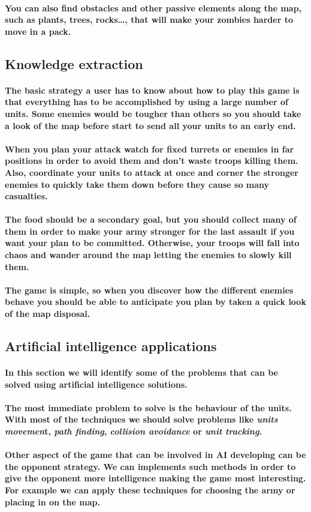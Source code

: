 \documentclass[a4paper,10pt]{article}
\newcommand{\p}[1]{\paragraph{\indent\textnormal{#1}}}
\begin{document}
  \p{You can also find obstacles and other passive elements along the map, such as plants, trees, rocks\dots, that will make your zombies harder to move in a pack.}

\newpage
  \subsection{Knowledge extraction}

    \p{The basic strategy a user has to know about how to play this game is that everything has to be accomplished by using a large number of units. Some enemies would be tougher than others so you should take a look of the map before start to send all your units to an early end.}

    \p{When you plan your attack watch for fixed turrets or enemies in far positions in order to avoid them and don't waste troops killing them. Also, coordinate your units to attack at once and corner the stronger enemies to quickly take them down before they cause so many casualties.}

    \p{The food should be a secondary goal, but you should collect many of them in order to make your army stronger for the last assault if you want your plan to be committed. Otherwise, your troops will fall into chaos and wander around the map letting the enemies to slowly kill them.}

    \p{The game is simple, so when you discover how the different enemies behave you should be able to anticipate you plan by taken a quick look of the map disposal.}

  \subsection{Artificial intelligence applications}

  \p{In this section we will identify some of the problems that can be solved using artificial intelligence solutions.}

  \p{The most immediate problem to solve is the behaviour of the units. With most of the techniques we should solve problems like \textit{units movemen}t, \textit{path finding}, \textit{collision avoidance} or \textit{unit tracking}.}

  \p{Other aspect of the game that can be involved in AI developing can be the opponent strategy. We can implements such methods in order to give the opponent more intelligence making the game most interesting. For example we can apply these techniques for choosing the army or placing in on the map.}
\end{document}
